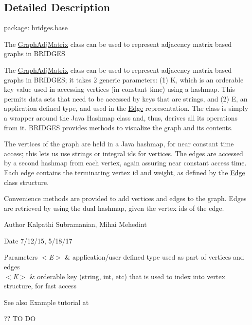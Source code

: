 \subsection{Detailed Description}
package\+: bridges.\+base 

The \hyperlink{class_graph_adj_matrix_1_1_graph_adj_matrix}{Graph\+Adj\+Matrix} class can be used to represent adjacency matrix based graphs in B\+R\+I\+D\+G\+E\+S

The \hyperlink{class_graph_adj_matrix_1_1_graph_adj_matrix}{Graph\+Adj\+Matrix} class can be used to represent adjacency matrix based graphs in B\+R\+I\+D\+G\+E\+S; it takes 2 generic parameters\+: (1) K, which is an orderable key value used in accessing vertices (in constant time) using a hashmap. This permits data sets that need to be accessed by keys that are strings, and (2) E, an application defined type, and used in the \hyperlink{namespace_edge}{Edge} representation. The class is simply a wrapper around the Java Hashmap class and, thus, derives all its operations from it. B\+R\+I\+D\+G\+E\+S provides methods to visualize the graph and its contents.

The vertices of the graph are held in a Java hashmap, for near constant time access; this lets us use strings or integral ids for vertices. The edges are accessed by a second hashmap from each vertex, again assuring near constant access time. Each edge contains the terminating vertex id and weight, as defined by the \hyperlink{namespace_edge}{Edge} class structure.

Convenience methods are provided to add vertices and edges to the graph. Edges are retrieved by using the dual hashmap, given the vertex ids of the edge.

\begin{DoxyAuthor}{Author}
Kalpathi Subramanian, Mihai Mehedint
\end{DoxyAuthor}
\begin{DoxyDate}{Date}
7/12/15, 5/18/17
\end{DoxyDate}

\begin{DoxyParams}{Parameters}
{\em $<$\+E$>$} & application/user defined type used as part of vertices and edges \\
\hline
{\em $<$\+K$>$} & orderable key (string, int, etc) that is used to index into vertex structure, for fast access\\
\hline
\end{DoxyParams}
\begin{DoxySeeAlso}{See also}
Example tutorial at 
\end{DoxySeeAlso}
?? T\+O D\+O 

